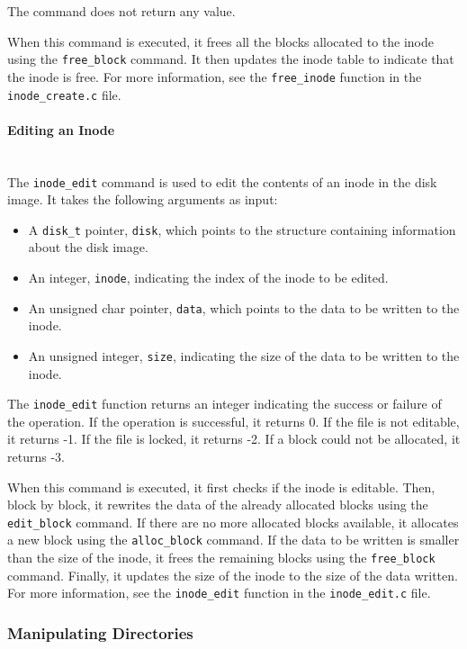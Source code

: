 \documentclass{article}
\begin{document}
The command does not return any value.

When this command is executed, it frees all the blocks allocated to the inode using the \texttt{free\_block} command. It then updates the inode table to indicate that the inode is free. For more information, see the \texttt{free\_inode} function in the \texttt{inode\_create.c} file.

\paragraph{Editing an Inode}\mbox{}\\
The \texttt{inode\_edit} command is used to edit the contents of an inode in the disk image. It takes the following arguments as input:

\begin{itemize}
    \item A \texttt{disk\_t} pointer, \texttt{disk}, which points to the structure containing information about the disk image.
    \item An integer, \texttt{inode}, indicating the index of the inode to be edited.
    \item An unsigned char pointer, \texttt{data}, which points to the data to be written to the inode.
    \item An unsigned integer, \texttt{size}, indicating the size of the data to be written to the inode.
\end{itemize}

The \texttt{inode\_edit} function returns an integer indicating the success or failure of the operation. If the operation is successful, it returns 0. If the file is not editable, it returns -1. If the file is locked, it returns -2. If a block could not be allocated, it returns -3.

When this command is executed, it first checks if the inode is editable. Then, block by block, it rewrites the data of the already allocated blocks using the \texttt{edit\_block} command. If there are no more allocated blocks available, it allocates a new block using the \texttt{alloc\_block} command. If the data to be written is smaller than the size of the inode, it frees the remaining blocks using the \texttt{free\_block} command. Finally, it updates the size of the inode to the size of the data written. For more information, see the \texttt{inode\_edit} function in the \texttt{inode\_edit.c} file.
\subsubsection{Manipulating Directories}
\end{document}
